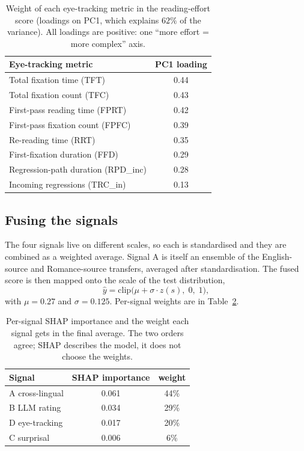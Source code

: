 \begin{table}[tbp]
\centering\small
\begin{tabular}{lc}
\toprule
\textbf{Eye-tracking metric} & \textbf{PC1 loading} \\
\midrule
Total fixation time (TFT) & 0.44 \\
Total fixation count (TFC) & 0.43 \\
First-pass reading time (FPRT) & 0.42 \\
First-pass fixation count (FPFC) & 0.39 \\
Re-reading time (RRT) & 0.35 \\
First-fixation duration (FFD) & 0.29 \\
Regression-path duration (RPD\_inc) & 0.28 \\
Incoming regressions (TRC\_in) & 0.13 \\
\bottomrule
\end{tabular}
\caption{Weight of each eye-tracking metric in the reading-effort score (loadings on PC1, which explains $62\%$ of
the variance). All loadings are positive: one ``more effort = more complex'' axis.}
\label{tab:pca}
\end{table}

\subsection{Fusing the signals}

The four signals live on different scales, so each is standardised and
they are combined as a weighted average. Signal A is itself an ensemble
of the English-source and Romance-source transfers, averaged after
standardisation. The fused score is then mapped onto the scale of the
test distribution,
\begin{equation}
  \label{eq:calib}
  \hat{y} = \mathrm{clip}\bigl(\mu + \sigma \cdot z(s),\; 0,\; 1\bigr),
\end{equation}
with $\mu = 0.27$ and $\sigma = 0.125$. Per-signal weights are in
Table~\ref{tab:signals}.

\begin{table}[tbp]
\centering\small
\begin{tabular}{lcc}
\toprule
\textbf{Signal} & \textbf{SHAP importance} & \textbf{weight} \\
\midrule
A cross-lingual & 0.061 & 44\% \\
B LLM rating & 0.034 & 29\% \\
D eye-tracking & 0.017 & 20\% \\
C surprisal & 0.006 & 6\% \\
\bottomrule
\end{tabular}
\caption{Per-signal SHAP importance and the weight each signal gets in the final average. The two orders agree;
SHAP describes the model, it does not choose the weights.}
\label{tab:signals}
\end{table}


